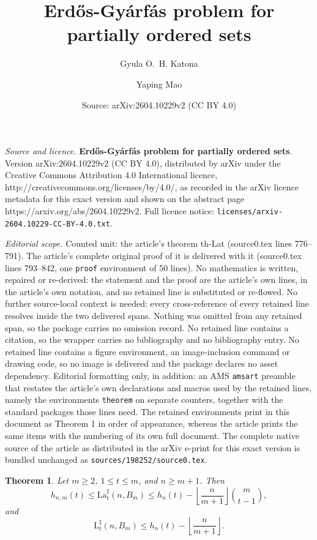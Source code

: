 \documentclass[10pt,a4paper]{amsart}
\title{\textbf{Erd\H{o}s-Gy\'{a}rf\'{a}s problem for partially ordered sets}}
\author{Gyula O.\, H. Katona \and Yaping Mao}
\date{Source: arXiv:2604.10229v2 (CC BY 4.0)}
\newtheorem{theorem}{Theorem}
\newcommand{\LT}{\mathrm{L}}
\newcommand{\LaT}{\mathrm{La}}
\newcommand{\floor}[1]{\flr{#1}}
\newcommand{\flr}[1]{\left\lfloor #1 \right\rfloor}
\begin{document}
\maketitle

\noindent\emph{Source and licence.} \textbf{Erd\H{o}s-Gy\'{a}rf\'{a}s problem for partially ordered sets}. Version arXiv:2604.10229v2 (CC BY 4.0), distributed by arXiv under the Creative Commons Attribution 4.0 International licence, http://creativecommons.org/licenses/by/4.0/, as recorded in the arXiv licence metadata for this exact version and shown on the abstract page https://arxiv.org/abs/2604.10229v2. Full licence notice: \texttt{licenses/arxiv-2604.10229-CC-BY-4.0.txt}.\par\smallskip

\noindent\textit{Editorial scope.} Counted unit: the article's theorem th-Lat (source0.tex lines 776--791). The article's complete original proof of it is delivered with it (source0.tex lines 793--842, one \texttt{proof} environment of 50 lines). No mathematics is written, repaired or re-derived: the statement and the proof are the article's own lines, in the article's own notation, and no retained line is substituted or re-flowed.  No further source-local context is needed: every cross-reference of every retained line resolves inside the two delivered spans.  Nothing was omitted from any retained span, so the package carries no omission record.  No retained line contains a citation, so the wrapper carries no bibliography and no bibliography entry.  No retained line contains a figure environment, an image-inclusion command or drawing code, so no image is delivered and the package declares no asset dependency.  Editorial formatting only, in addition: an AMS \texttt{amsart} preamble that restates the article's own declarations and macros used by the retained lines, namely the environments \texttt{theorem} on separate counters, together with the standard packages those lines need.  The retained environments print in this document as Theorem 1 in order of appearance, whereas the article prints the same items with the numbering of its own full document.  The complete native source of the article as distributed in the arXiv e-print for this exact version is bundled unchanged as \texttt{sources/198252/source0.tex}.
\begin{theorem}\label{th-Lat}
Let $m\ge2$, $1\le t\le m$, and $n\ge m+1$. Then
\[
h_{n,m}(t)
\le
\LaT_t^\sharp(n,B_m)
\le
h_n(t)-\floor{\frac{n}{m+1}}\binom{m}{t-1},
\]
and
\[
\LT_t^\sharp(n,B_m)
\le
h_n(t)-\floor{\frac{n}{m+1}}.
\]
\end{theorem}
\end{document}

